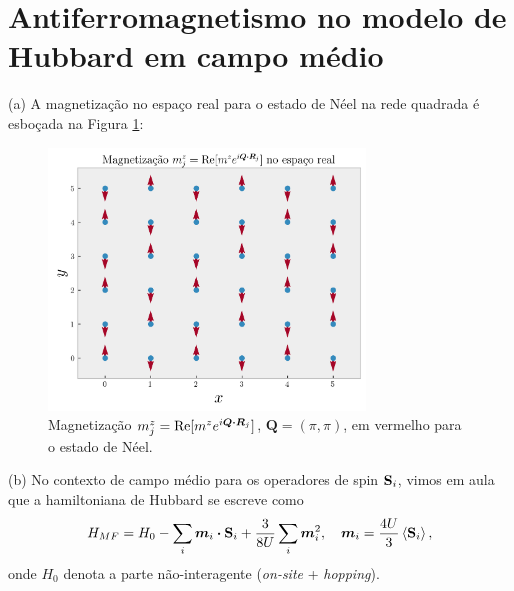 \documentclass[a4paper,10pt]{article}
\begin{document}
\pagebreak

\section{Antiferromagnetismo no modelo de Hubbard em campo médio}

(a) A magnetização no espaço real para o estado de Néel na rede quadrada é esboçada na Figura \ref{fig:mag-neel}:
\begin{figure}[H]
\centering
\includegraphics[width=0.75\textwidth]{fig/magnetization-real_space.png}
\caption{Magnetização $m^z_j = \Re[m^z e^{i \bm{Q} \vdot \bm{R}_j}]$, $\bm{Q} = (\pi, \pi)$, em vermelho para o estado de Néel.}
\label{fig:mag-neel}
\end{figure}

(b) No contexto de campo médio para os operadores de spin $\S_i$, vimos em aula que a hamiltoniana de Hubbard se escreve como
$$
H_{MF} = H_0 - \sum_{i} \bm{m}_i \vdot \S_i + \frac{3}{8U} \sum_{i} \bm{m}_i^2, \quad
\bm{m}_i = \frac{4U}{3} \ev{\S_i},
$$
onde $H_0$ denota a parte não-interagente (\textit{on-site} + \textit{hopping}).

\n
\end{document}
